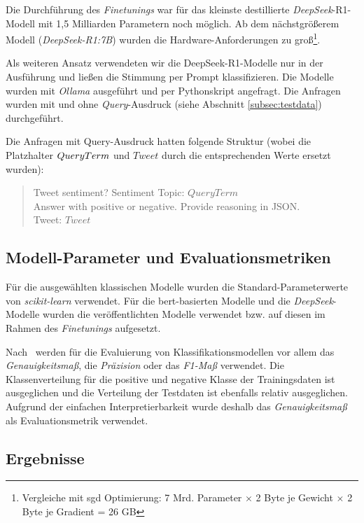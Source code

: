 Die Durchführung des \textit{Finetunings} war für das kleinste destillierte \textit{DeepSeek}-R1-Modell mit 1,5 Milliarden Parametern noch möglich.
Ab dem nächstgrößerem Modell (\textit{DeepSeek-R1:7B}) wurden die Hardware-Anforderungen zu groß\footnote{Vergleiche mit \gls{sgd} Optimierung: 7 Mrd. Parameter $\times$ 2 Byte je Gewicht $\times$ 2 Byte je Gradient = 26 GB}.

Als weiteren Ansatz verwendeten wir die DeepSeek-R1-Modelle nur in der Ausführung und ließen die Stimmung per Prompt klassifizieren.
Die Modelle wurden mit \textit{Ollama} ausgeführt und per Pythonskript angefragt.
Die Anfragen wurden mit und ohne \textit{Query}-Ausdruck (siehe Abschnitt \ref{subsec:testdata}) durchgeführt.

Die Anfragen mit Query-Ausdruck hatten folgende Struktur (wobei die Platzhalter $Query\-Term$ und $Tweet$ durch die entsprechenden Werte ersetzt wurden):
\begin{quote}
    Tweet sentiment? Sentiment Topic: $QueryTerm$\\
    Answer with positive or negative. Provide reasoning in JSON.\\
    Tweet: $Tweet$
\end{quote}

\subsection{Modell-Parameter und Evaluationsmetriken}\label{subsec:modell-parameter-und-evaluationsmetriken}

Für die ausgewählten klassischen Modelle wurden die Standard-Parameterwerte von \textit{scikit-learn} verwendet.
Für die \gls{bert}-basierten Modelle und die \textit{DeepSeek}-Modelle wurden die veröffentlichten Modelle verwendet bzw. auf diesen im Rahmen des \textit{Finetunings} aufgesetzt.

Nach~\cite{wankhade2022survey} werden für die Evaluierung von Klassifikationsmodellen vor allem das \textit{Genauig\-keits\-maß}, die \textit{Präzision} oder das \textit{F1-Maß} verwendet.
Die Klassenverteilung für die positive und negative Klasse der Trainingsdaten ist ausgeglichen und die Verteilung der Testdaten ist ebenfalls relativ ausgeglichen.
Aufgrund der einfachen Interpretierbarkeit wurde deshalb das \textit{Genauigkeitsmaß} als Evaluationsmetrik verwendet.

\subsection{Ergebnisse}

